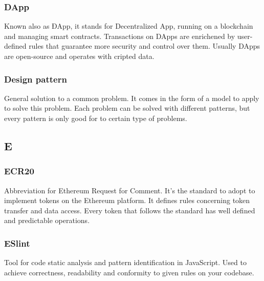 \subsubsection*{DApp}

Known also as ÐApp, it stands for Decentralized App, running on a blockchain and managing smart contracts. Transactions on DApps are enrichened by user-defined rules that guarantee more security and control over them. Usually DApps are open-source and operates with cripted data.

\subsubsection*{Design pattern}
General solution to a common problem. It comes in the form of a model to apply to solve this problem. Each problem can be solved with different patterns, but every pattern is only good for to certain type of problems.

\subsection*{E}

\subsubsection*{ECR20}
Abbreviation for Ethereum Request for Comment. It's the standard to adopt to implement tokens on the Ethereum platform.
It defines rules concerning token transfer and data access. Every token that follows the standard has well defined and predictable operations.


\subsubsection*{ESlint}
Tool for code static analysis and pattern identification in JavaScript. Used to achieve correctness, readability and conformity to given rules on your codebase.

